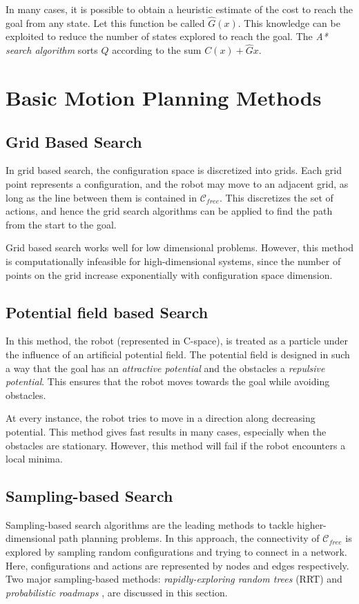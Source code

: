 In many cases, it is possible to obtain a heuristic estimate of the cost to reach the goal from any state. Let this function be called $\hat{G}(x)$. This knowledge can be exploited to reduce the number of states explored to reach the goal. The \textit{A* search algorithm} sorts $Q$ according to the sum $C(x) + \hat{G}{x}$.


\section{Basic Motion Planning Methods}

\subsection{Grid Based Search}
In grid based search, the configuration space is discretized into grids. Each grid point represents a configuration, and the robot may move to an adjacent grid, as long as the line between them is contained in $\mathcal{C}_{free}$. This discretizes the set of actions, and hence the grid search algorithms can be applied to find the path from the start to the goal. 

Grid based search works well for low dimensional problems. However, this method is computationally infeasible for high-dimensional systems, since the number of points on the grid increase exponentially with configuration space dimension. 
\subsection{Potential field based Search}
In this method, the robot (represented in C-space), is treated as a particle under the influence of an artificial potential field. The potential field is designed in such a way that the goal has an \textit{attractive potential} and the obstacles a \textit{repulsive potential}. This ensures that the robot moves towards the goal while avoiding obstacles. 

At every instance, the robot tries to move in a direction along decreasing potential. This method gives fast results in many cases, especially when the obstacles are stationary. However, this method will fail if the robot encounters a local minima.
\subsection{Sampling-based Search}
Sampling-based search algorithms are the leading methods to tackle higher-dimensional path planning problems. In this approach, the connectivity of $\mathcal{C}_{free}$ is explored by sampling random configurations and trying to connect in a network. Here, configurations and actions are represented by nodes and edges respectively. Two major sampling-based methods: \textit{rapidly-exploring random trees} (RRT) \cite{lavalle2006planning} and \textit{probabilistic roadmaps} \cite{kavraki1994probabilistic}, are discussed in this section.

